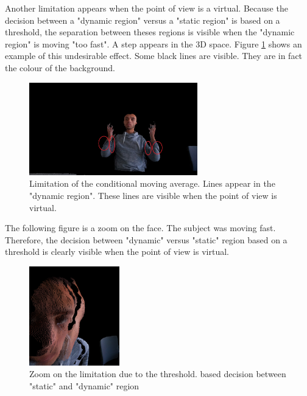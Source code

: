 Another limitation appears when the point of view is a virtual. Because the decision between a "dynamic region" versus a "static region" is based on a threshold, the separation between theses regions is visible when the "dynamic region" is moving "too fast". A step appears in the 3D space. Figure \ref{figure:limitation_00497_5_50_red} shows an example of this undesirable effect. Some black lines are visible. They are in fact the colour of the background.

\begin{figure}[H]
    \centering
    \includegraphics[width=0.65\textwidth]{images/visual_enhancement/limitation_00497_5_50_red.jpg}
    \caption{Limitation of the conditional moving average. Lines appear in the "dynamic region". These lines are visible when the point of view is virtual.}
    \label{figure:limitation_00497_5_50_red}
\end{figure}

The following figure is a zoom on the face. The subject was moving fast. Therefore, the decision between "dynamic" versus "static" region based on a threshold is clearly visible when the point of view is virtual.

\begin{figure}[H]
    \centering
    \includegraphics[width=0.35\textwidth]{images/visual_enhancement/edge/zoom_lines.png}
    \caption{Zoom on the limitation due to the threshold. based decision between "static" and "dynamic" region}
    \label{figure:zoom_lines}
\end{figure}

